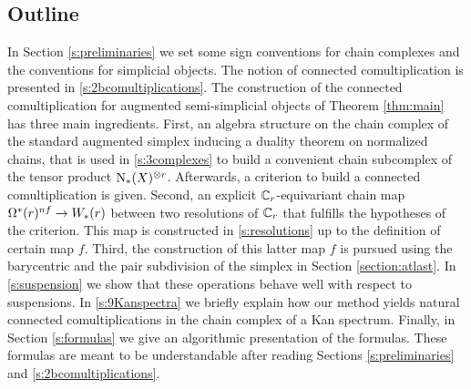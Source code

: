 \subsection{Outline} In Section \ref{s:preliminaries} we set some sign conventions for chain complexes and the conventions for simplicial objects. The notion of connected comultiplication is presented in \cref{s:2bcomultiplications}. The construction of the connected comultiplication for augmented semi-simplicial objects of Theorem \ref{thm:main} has three main ingredients.
First, an algebra structure on the chain complex of the standard augmented simplex inducing a duality theorem on normalized chains, that is used in \cref{s:3complexes} to build a convenient chain subcomplex of the tensor product $\operatorname{N}_{*}(X)^{\otimes r}$. Afterwards, a criterion to build a connected comultiplication is given.
Second, an explicit $\mathbb{C}_r$-equivariant chain map $\Omega^*(r)^{nf}\to W_*(r)$ between two resolutions of $\mathbb{C}_r$ that fulfills the hypotheses of the criterion. This map is constructed in \cref{s:resolutions} up to the definition of certain map $f$. Third, the construction of this latter map $f$ is pursued using the barycentric and the pair subdivision of the simplex in Section \ref{section:atlast}. In \cref{s:suspension} we show that these operations behave well with respect to suspensions. In \cref{s:9Kanspectra} we briefly explain how our method yields natural connected comultiplications in the chain complex of a Kan spectrum. Finally, in Section \ref{s:formulas} we give an algorithmic presentation of the formulas. These formulas are meant to be understandable after reading Sections \ref{s:preliminaries} and \ref{s:2bcomultiplications}. 